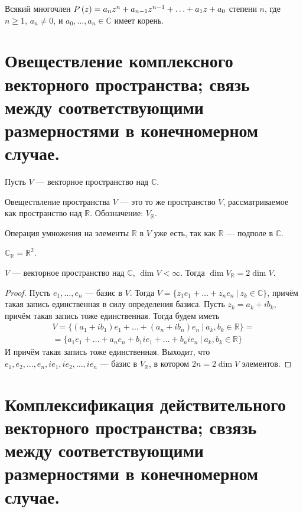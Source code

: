\begin{Theorem}
Всякий многочлен $P\left(z\right) = a_nz^n + a_{n-1}z^{n-1} + \ldots \hm{+} a_1z + a_0$ степени $n$, где $n \geqslant 1$, $a_n \neq 0$, и $a_0,\ldots,a_n \in \mathbb{C}$ имеет корень.
\end{Theorem}

\section{Овеществление комплексного векторного пространства; связь между соответствующими размерностями в конечномерном случае.}

Пусть $V$ --- векторное пространство над $\mathbb{C}$.
\begin{Def}
Овеществление пространства $V$ --- это то же пространство $V$, рассматриваемое как пространство над $\mathbb{R}$. Обозначение: $V_\mathbb{R}$.
\end{Def}
Операция умножения на элементы $\mathbb{R}$ в $V$ уже есть, так как $\mathbb{R}$ --- подполе в $\mathbb{C}$.

\begin{Examples}
$\mathbb{C}_\mathbb{R} = \mathbb{R}^2$.
\end{Examples}
\begin{Suggestion}
$V$ --- векторное пространство над $\mathbb{C}$, $\dim V < \infty$. Тогда $\dim V_\mathbb{R} = 2\dim V$.
\end{Suggestion}
\begin{proof}
Пусть $e_1, \ldots, e_n$ --- базис в $V$. Тогда $V = \{z_1e_1 + \ldots + z_ne_n\ |\ z_k \in \mathbb{C}\}$, причём такая запись единственная в силу определения базиса. Пусть $z_k = a_k+ib_k$, причём такая запись тоже единственная. Тогда будем иметь
\begin{gather*}
V = \{ \left(a_1+ib_1\right)e_1 + \ldots + \left(a_n+ib_n\right)e_n\ |\ a_k, b_k \in \mathbb{R}\} =\\
= \{a_1e_1 + \ldots + a_ne_n + b_1ie_1 + \ldots + b_nie_n\ |\ a_k, b_k \in \mathbb{R}\}
\end{gather*}
И причём такая запись тоже единственная. Выходит, что $e_1, e_2, \ldots, e_n, ie_1, ie_2, \ldots, ie_n$ --- базис в $V_\mathbb{R}$, в котором $2n = 2\dim V$ элементов.
\end{proof}

\section{Комплексификация действительного векторного пространства; свзязь между соответствующими размерностями в конечномерном случае.}

